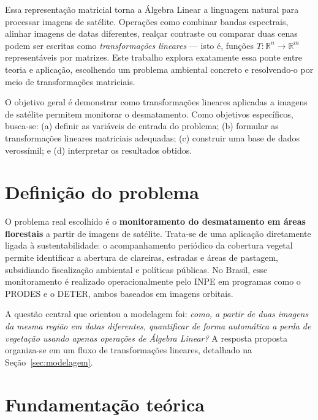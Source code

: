 \documentclass[12pt,a4paper,oneside]{article}
\begin{document}
Essa representação matricial torna a Álgebra Linear a linguagem natural para
processar imagens de satélite. Operações como combinar bandas espectrais,
alinhar imagens de datas diferentes, realçar contraste ou comparar duas cenas
podem ser escritas como \emph{transformações lineares} --- isto é, funções
$T:\mathbb{R}^n \to \mathbb{R}^m$ representáveis por matrizes. Este trabalho
explora exatamente essa ponte entre teoria e aplicação, escolhendo um problema
ambiental concreto e resolvendo-o por meio de transformações matriciais.

O objetivo geral é demonstrar como transformações lineares aplicadas a imagens
de satélite permitem monitorar o desmatamento. Como objetivos específicos,
busca-se: (a) definir as variáveis de entrada do problema; (b) formular as
transformações lineares matriciais adequadas; (c) construir uma base de dados
verossímil; e (d) interpretar os resultados obtidos.

\section{Definição do problema}
O problema real escolhido é o \textbf{monitoramento do desmatamento em áreas
florestais} a partir de imagens de satélite. Trata-se de uma aplicação
diretamente ligada à sustentabilidade: o acompanhamento periódico da cobertura
vegetal permite identificar a abertura de clareiras, estradas e áreas de
pastagem, subsidiando fiscalização ambiental e políticas públicas. No Brasil,
esse monitoramento é realizado operacionalmente pelo INPE em programas como o
PRODES e o DETER, ambos baseados em imagens orbitais.

A questão central que orientou a modelagem foi: \emph{como, a partir de duas
imagens da mesma região em datas diferentes, quantificar de forma automática a
perda de vegetação usando apenas operações de Álgebra Linear?} A resposta
proposta organiza-se em um fluxo de transformações lineares, detalhado na
Seção~\ref{sec:modelagem}.

\section{Fundamentação teórica}
\end{document}
